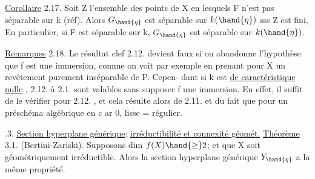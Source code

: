 
\uline{Corollaire} 2.17.   Soit Z l'ensemble des points de X en lesquels F
n'est pas séparable sur k (réf). Alors  $G_{\hand{\eta}}$ est séparable sur $k(\hand{\eta})$ sss
Z est fini, En particulier, si F est séparable sur k, $G_{\hand{\eta}}$ est séparable
sur $k(\hand{\eta})$.

\uline{Remarques} 2.18.  Le résultat clef  2.12.  devient faux si on abandonne
l'hypothèse que f est une immersion, comme  on voit par exemple en
prenant pour  X un revêtement purement inséparable de P.   Cepen-%
dant 
  si  k est \uline{de caractéristique nulle} ,  2.12. à
2.1. sont valables sans supposer f une immersion.  En effet, il suffit
de le vérifier pour 2.12. , et  cela résulte alors de 2.11. et du fait
que  pour un préschéma algébrique en c ar 0,  lisse = régulier.


.3.   \uline{Section hyperplane générique}: \uline{irréductibilité et connexité géomét.}
\uline{Théorème} 3.1. (Bertini-Zariski).  Supposons dim $f(X) \hand{\geq} 2$; et que X
soit  géométriquement irréductible\deleted{)}. Alors
la section hyperplane générique $Y_{\hand{\eta}}$ a la même propriété.


